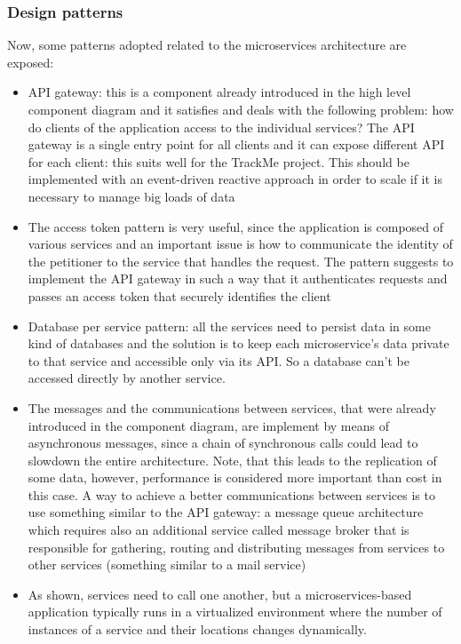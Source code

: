 \subsubsection{Design patterns}
Now, some patterns adopted related to the microservices architecture are exposed:
\begin{itemize}
\item API gateway: this is a component already introduced in the high level component diagram and it
satisfies and deals with the following problem: how do clients of the application access to the individual
services? The API gateway is a single entry point for all clients and it can expose different API for
each client: this suits well for the TrackMe project. This should be implemented with an event-driven
reactive approach in order to scale if it is necessary to manage big loads of data \\
\item The access token pattern is very useful, since the application is composed of various services and
an important issue is how to communicate the identity of the petitioner to the service that handles the
request. 
The pattern suggests to implement the API gateway in such
a way that it authenticates requests and passes an access token that securely identifies the client
\item Database per service pattern: all the services need to persist data in some kind of databases and
the solution is to keep each microservice's data private to that service and accessible only via its API.
So a database can't be accessed directly by another service.
\item The messages and the communications between services, that were already introduced in the component diagram, are implement by means of
asynchronous messages, since a chain of synchronous calls could lead to slowdown the entire architecture. Note, that this leads to the
replication of some data, however, performance is considered more important than cost in this case. A way to achieve a better communications between services is to use something similar to the API gateway: a message queue architecture which requires also an additional service called message broker that is responsible for gathering, routing and distributing messages from services to other services (something similar to a mail service)
\item 
As shown, services need to call one another, but a microservices-based application typically runs in a virtualized 
environment where the number of instances of a service and their locations changes dynamically. 

\end{itemize}
